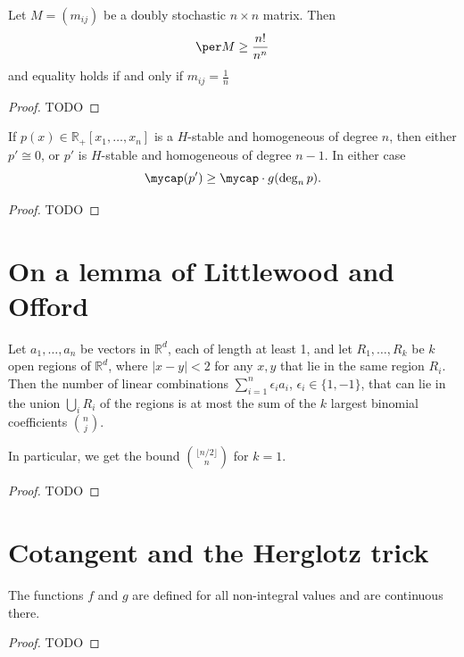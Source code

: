 \begin{theorem}
  \label{vanderwaerden}
  Let $M = (m_{ij})$ be a doubly stochastic $n \times n$ matrix.
  Then
  \[\per M \ge \frac{n!}{n^n}\]
  and equality holds if and only if $m_{ij} = \frac{1}{n}$
\end{theorem}
\begin{proof}
  TODO
\end{proof}

\begin{proposition}
  \label{gurvit}
  If $p(x)\in \mathbb{R}_+[x_1, \dots, x_n]$ is a $H$-stable and homogeneous of degree $n$, then
  either $p'\cong 0$, or $p'$ is $H$-stable and homogeneous of degree $n - 1$. In either
  case
  \[
  \mycap(p') \ge \mycap\cdot g(\deg_np).
  \]
\end{proposition}
\begin{proof}
  TODO
\end{proof}


\chapter{On a lemma of Littlewood and Offord}

\begin{theorem}
  \label{ch25theorem}
  Let $a_1, \dots, a_n$ be vectors in $\mathbb{R}^d$, each of length at least 1,
  and let $R_1, \dots, R_k$ be $k$ open regions of $\mathbb{R}^d$, where $|x - y| < 2$
  for any $x, y$ that lie in the same region $R_i$. Then the number of linear
  combinations $\sum_{i=1}^{n} \epsilon_i a_i$, $\epsilon_i \in \{1, -1\}$,
  that can lie in the union $\bigcup_i R_i$ of the regions is at most the sum of
  the $k$ largest binomial coefficients $\binom{n}{j}$.

  In particular, we get the bound $\binom{\lfloor n/2 \rfloor}{n}$ for $k = 1$.
\end{theorem}
\begin{proof}
  TODO
\end{proof}


\chapter{Cotangent and the Herglotz trick}

\begin{lemma}[A]
  \label{ch26lemma_a}
  The functions $f$ and $g$ are defined for all non-integral values and are continuous there.
\end{lemma}
\begin{proof}
  TODO
\end{proof}

